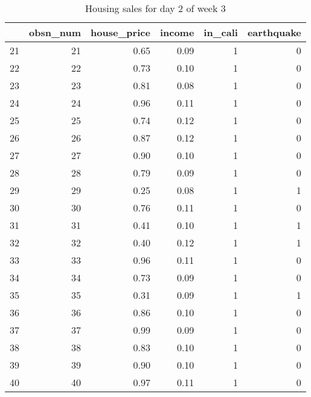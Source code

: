 \begin{table}[ht]
\centering
\begin{tabular}{rrrrrr}
  \hline
 & obsn\_num & house\_price & income & in\_cali & earthquake \\ 
  \hline
21 &  21 & 0.65 & 0.09 &   1 &   0 \\ 
  22 &  22 & 0.73 & 0.10 &   1 &   0 \\ 
  23 &  23 & 0.81 & 0.08 &   1 &   0 \\ 
  24 &  24 & 0.96 & 0.11 &   1 &   0 \\ 
  25 &  25 & 0.74 & 0.12 &   1 &   0 \\ 
  26 &  26 & 0.87 & 0.12 &   1 &   0 \\ 
  27 &  27 & 0.90 & 0.10 &   1 &   0 \\ 
  28 &  28 & 0.79 & 0.09 &   1 &   0 \\ 
  29 &  29 & 0.25 & 0.08 &   1 &   1 \\ 
  30 &  30 & 0.76 & 0.11 &   1 &   0 \\ 
  31 &  31 & 0.41 & 0.10 &   1 &   1 \\ 
  32 &  32 & 0.40 & 0.12 &   1 &   1 \\ 
  33 &  33 & 0.96 & 0.11 &   1 &   0 \\ 
  34 &  34 & 0.73 & 0.09 &   1 &   0 \\ 
  35 &  35 & 0.31 & 0.09 &   1 &   1 \\ 
  36 &  36 & 0.86 & 0.10 &   1 &   0 \\ 
  37 &  37 & 0.99 & 0.09 &   1 &   0 \\ 
  38 &  38 & 0.83 & 0.10 &   1 &   0 \\ 
  39 &  39 & 0.90 & 0.10 &   1 &   0 \\ 
  40 &  40 & 0.97 & 0.11 &   1 &   0 \\ 
   \hline
\end{tabular}
\caption{Housing sales for day 2 of week 3} 
\end{table}
